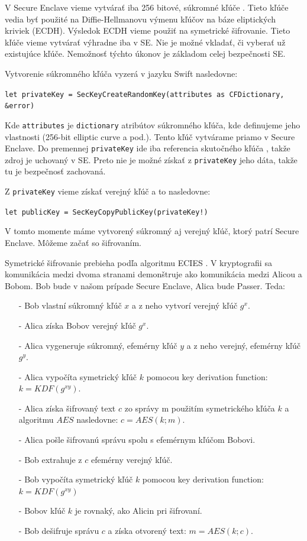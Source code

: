 V Secure Enclave vieme vytvárať iba 256 bitové, súkromné kľúče \cite{secureenclave_appledoc}. Tieto kľúče vedia byť použité na Diffie-Hellmanovu výmenu kľúčov na báze eliptických kriviek (ECDH). Výsledok ECDH vieme použiť na symetrické šifrovanie. Tieto kľúče vieme vytvárať výhradne iba v SE. Nie je možné vkladať, či vyberať už existujúce kľúče. Nemožnosť týchto úkonov je základom celej bezpečnosti SE. 

Vytvorenie súkromného kľúča vyzerá v jazyku Swift nasledovne:

\begin{center}
    \texttt{let privateKey = SecKeyCreateRandomKey(attributes as CFDictionary, \&error)}
\end{center}

\noindent Kde \texttt{attributes} je \texttt{dictionary} atribútov súkromného kľúča, kde definujeme jeho vlastnosti (256-bit elliptic curve a pod.). Tento kľúč vytvárame priamo v Secure Enclave. Do premennej \texttt{privateKey} ide iba referencia skutočného kľúča \cite{secureenclave_appledoc}, takže zdroj je uchovaný v SE. Preto nie je možné získať z \texttt{privateKey} jeho dáta, takže tu je bezpečnosť zachovaná. 

Z \texttt{privateKey} vieme získať verejný kľúč a to nasledovne: 

\begin{center}
    \texttt{let publicKey = SecKeyCopyPublicKey(privateKey!)}
\end{center}

\noindent V tomto momente máme vytvorený súkromný aj verejný kľúč, ktorý patrí Secure Enclave. Môžeme začať so šifrovaním.

Symetrické šifrovanie prebieha podľa algoritmu ECIES \cite{ecies}. V kryptografii sa komunikácia medzi dvoma stranami demonštruje ako komunikácia medzi Alicou a Bobom. Bob bude v našom prípade Secure Enclave, Alica bude Passer. Teda:
\begin{itemize}
    \item[-] Bob vlastní súkromný kľúč $x$ a z neho vytvorí verejný kľúč $g^{x}$. 
    \item[-] Alica získa Bobov verejný kľúč $g^{x}$.
    \item[-] Alica vygeneruje súkromný, efemérny kľúč $y$ a z neho verejný, efemérny kľúč $g^{y}$.
    \item[-] Alica vypočíta symetrický kľúč $k$ pomocou key derivation function: $k = KDF(g^{xy})$.
    \item[-] Alica získa šifrovaný text $c$ zo správy m použitím symetrického kľúča $k$ a algoritmu $AES$ nasledovne: $c = AES(k;m)$.
    \item[-] Alica pošle šifrovanú správu spolu s efemérnym kľúčom Bobovi. 
    \item[-] Bob extrahuje z $c$ efemérny verejný kľúč.
    \item[-] Bob vypočíta symetrický kľúč $k$ pomocou key derivation function: $k=KDF(g^{xy})$
    \item[-] Bobov kľúč $k$ je rovnaký, ako Alicin pri šifrovaní.
    \item[-] Bob dešifruje správu $c$ a získa otvorený text: $m = AES(k;c)$.
\end{itemize}

